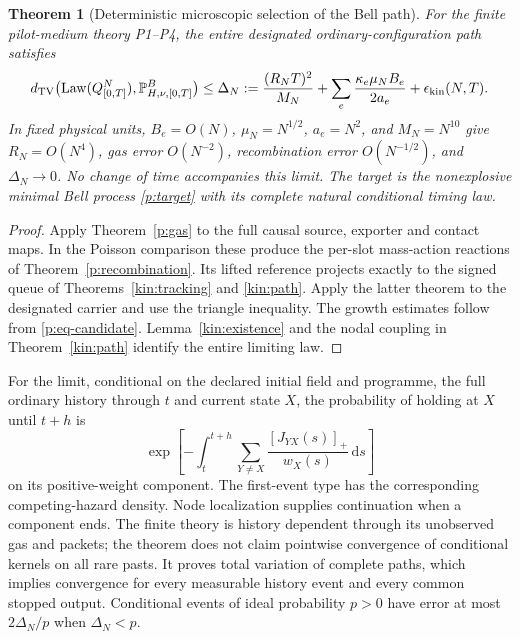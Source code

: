 \documentclass[11pt,oneside,openany]{book}
\newtheorem{theorem}{Theorem}[chapter]
\theoremstyle{definition}
\theoremstyle{remark}\newtheorem{remark}[theorem]{Remark}
\providecommand{\TV}{d_{\mathrm{TV}}}
\providecommand{\dd}{\,\mathrm d}
\providecommand{\pLaw}{\operatorname{Law}}
\begin{document}
\begin{theorem}[Deterministic microscopic selection of the Bell path]\label{p:main}
For the finite pilot-medium theory P1--P4, the entire designated ordinary-configuration path satisfies
\begin{equation}
 \TV\bigl(\pLaw(Q^N_{[0,T]}),\mathbb P^B_{H,\nu,[0,T]}\bigr)
 \le \Delta_N:=\frac{(R_NT)^2}{M_N}
       +\sum_e\frac{\kappa_e\mu_NB_e}{2a_e}
       +\epsilon_{\rm kin}(N,T).
 \label{p:eq-mainerror}
\end{equation}
In fixed physical units, $B_e=O(N)$, $\mu_N=N^{1/2}$, $a_e=N^2$, and $M_N=N^{10}$ give $R_N=O(N^4)$, gas error $O(N^{-2})$, recombination error $O(N^{-1/2})$, and $\Delta_N\to0$. No change of time accompanies this limit. The target is the nonexplosive minimal Bell process \eqref{p:target} with its complete natural conditional timing law.
\end{theorem}
\begin{proof}
Apply Theorem~\ref{p:gas} to the full causal source, exporter and contact maps. In the Poisson comparison these produce the per-slot mass-action reactions of Theorem~\ref{p:recombination}. Its lifted reference projects exactly to the signed queue of Theorems~\ref{kin:tracking} and \ref{kin:path}. Apply the latter theorem to the designated carrier and use the triangle inequality. The growth estimates follow from \eqref{p:eq-candidate}. Lemma~\ref{kin:existence} and the nodal coupling in Theorem~\ref{kin:path} identify the entire limiting law.
\end{proof}

For the limit, conditional on the declared initial field and programme, the full ordinary history through $t$ and current state $X$, the probability of holding at $X$ until $t+h$ is
\begin{equation}
 \exp\left[-\int_t^{t+h}\sum_{Y\ne X}\frac{[J_{YX}(s)]_+}{w_X(s)}\dd s\right]
 \label{p:eq-survival}
\end{equation}
on its positive-weight component. The first-event type has the corresponding competing-hazard density. Node localization supplies continuation when a component ends. The finite theory is history dependent through its unobserved gas and packets; the theorem does not claim pointwise convergence of conditional kernels on all rare pasts. It proves total variation of complete paths, which implies convergence for every measurable history event and every common stopped output. Conditional events of ideal probability $p>0$ have error at most $2\Delta_N/p$ when $\Delta_N<p$.
\end{document}
